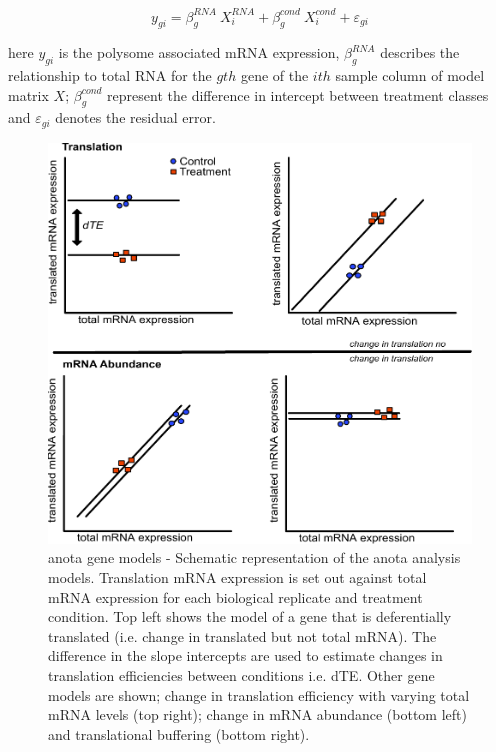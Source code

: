 \documentclass[12pt,openany]{book}
\begin{document}
\[y_{gi} = \beta_g^{RNA}\ X_i^{RNA}+ \beta_g^{cond}\ X_i^{cond} + \varepsilon_{gi}\]

here \(y_{gi}\) is the polysome associated mRNA expression,
\(\beta_g^{RNA}\) describes the relationship to total RNA for the
\(gth\) gene of the \(ith\) sample column of model matrix \(X\);
\(\beta_g^{cond}\) represent the difference in intercept between
treatment classes and \(\varepsilon_{gi}\) denotes the residual error.

\begin{figure}
  \includegraphics{./figures/geneModes_anota_Larsson.pdf}
  \caption{anota gene models - Schematic representation of the anota analysis models. Translation mRNA expression is set out against total mRNA expression for each biological replicate and treatment condition. Top left shows the model of a gene that is deferentially translated (i.e. change in translated but not total mRNA). The difference in the slope intercepts are used to estimate changes in translation efficiencies between conditions i.e. dTE. Other gene models are shown; change in translation efficiency with varying total mRNA levels (top right); change in mRNA abundance (bottom left) and translational buffering (bottom right).
  \label{fig:anota}}
\end{figure}
\end{document}
